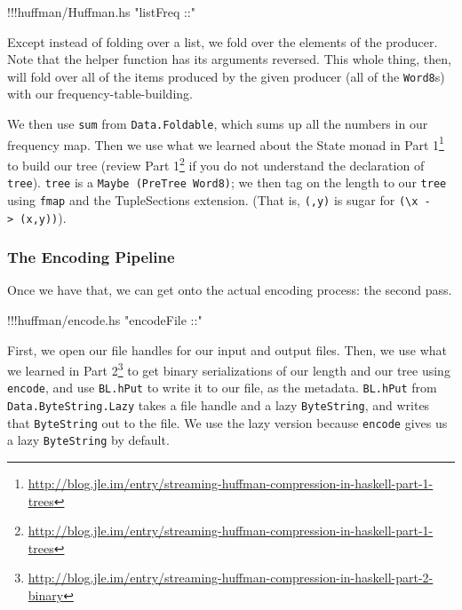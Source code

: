 \documentclass[]{article}
\newenvironment{Shaded}{}{}
\newcommand{\StringTok}[1]{\textcolor[rgb]{0.25,0.44,0.63}{{#1}}}
\newcommand{\FunctionTok}[1]{\textcolor[rgb]{0.02,0.16,0.49}{{#1}}}
\newcommand{\NormalTok}[1]{{#1}}
\renewcommand{\href}[2]{#2\footnote{\url{#1}}}
\begin{document}
\begin{Shaded}
\begin{Highlighting}[]
\FunctionTok{!!!}\NormalTok{huffman}\FunctionTok{/}\NormalTok{Huffman.hs }\StringTok{"listFreq ::"}
\end{Highlighting}
\end{Shaded}

Except instead of folding over a list, we fold over the elements of the
producer. Note that the helper function has its arguments reversed. This
whole thing, then, will fold over all of the items produced by the given
producer (all of the \texttt{Word8}s) with our frequency-table-building.

We then use \texttt{sum} from \texttt{Data.Foldable}, which sums up all
the numbers in our frequency map. Then we use what we learned about the
State monad in
\href{http://blog.jle.im/entry/streaming-huffman-compression-in-haskell-part-1-trees}{Part
1} to build our tree (review
\href{http://blog.jle.im/entry/streaming-huffman-compression-in-haskell-part-1-trees}{Part
1} if you do not understand the declaration of \texttt{tree}).
\texttt{tree} is a \texttt{Maybe\ (PreTree\ Word8)}; we then tag on the
length to our \texttt{tree} using \texttt{fmap} and the TupleSections
extension. (That is, \texttt{(,y)} is sugar for
\texttt{(\textbackslash{}x\ -\textgreater{}\ (x,y))}).

\subsubsection{The Encoding Pipeline}\label{the-encoding-pipeline}

Once we have that, we can get onto the actual encoding process: the
second pass.

\begin{Shaded}
\begin{Highlighting}[]
\FunctionTok{!!!}\NormalTok{huffman}\FunctionTok{/}\NormalTok{encode}\FunctionTok{.}\NormalTok{hs }\StringTok{"encodeFile ::"}
\end{Highlighting}
\end{Shaded}

First, we open our file handles for our input and output files. Then, we
use what we learned in
\href{http://blog.jle.im/entry/streaming-huffman-compression-in-haskell-part-2-binary}{Part
2} to get binary serializations of our length and our tree using
\texttt{encode}, and use \texttt{BL.hPut} to write it to our file, as
the metadata. \texttt{BL.hPut} from \texttt{Data.ByteString.Lazy} takes
a file handle and a lazy \texttt{ByteString}, and writes that
\texttt{ByteString} out to the file. We use the lazy version because
\texttt{encode} gives us a lazy \texttt{ByteString} by default.
\end{document}
